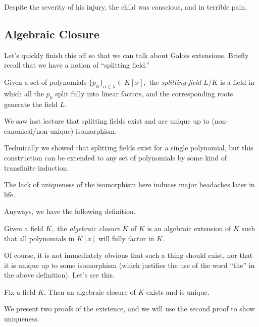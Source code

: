 














Despite the severity of his injury, the child was conscious, and in terrible pain.

\subsection{Algebraic Closure}
Let's quickly finish this off so that we can talk about Galois extensions. Briefly recall that we have a notion of ``splitting field.''
\begin{definition}
	Given a set of polynomials $\{p_\alpha\}_{\alpha\in\lambda}\in K[x],$ the \textit{splitting field} $L/K$ is a field in which all the $p_k$ split fully into linear factors, and the corresponding roots generate the field $L.$
\end{definition}
We saw last lecture that splitting fields exist and are unique up to (non-canonical/non-unique) isomorphism.
\begin{remark}
	Technically we showed that splitting fields exist for a single polynomial, but this construction can be extended to any set of polynomials by some kind of transfinite induction.
\end{remark}
\begin{remark}
	The lack of uniqueness of the isomorphism here induces major headaches later in life.
\end{remark}
Anyways, we have the following definition.
\begin{definition}
	Given a field $K,$ the \textit{algebraic closure} $\overline K$ of $K$ is an algebraic extension of $K$ such that all polynomials in $\overline K[x]$ will fully factor in $\overline K.$
\end{definition}
Of course, it is not immediately obvious that such a thing should exist, nor that it is unique up to some isomorphism (which justifies the use of the word ``the'' in the above definition). Let's see this.
\begin{proposition} \label{prop:algclose}
	Fix a field $K.$ Then an algebraic closure of $K$ exists and is unique.
\end{proposition}
We present two proofs of the existence, and we will use the second proof to show uniqueness.
